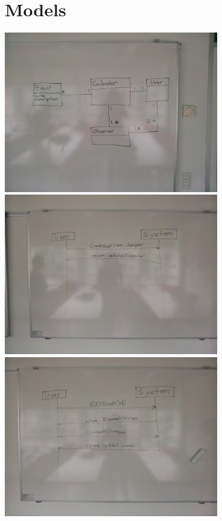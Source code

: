 \documentclass[a4paper,10pt,titlepage]{article}
\begin{document}
\section{Models}
\includegraphics[width=0.7\textwidth]{./domainmodel}\\[1cm] 
\includegraphics[width=0.7\textwidth]{./ssd}\\[1cm] 
\includegraphics[width=0.7\textwidth]{./ssd2}\\[1cm] 
	
	
	
	
\end{document}
